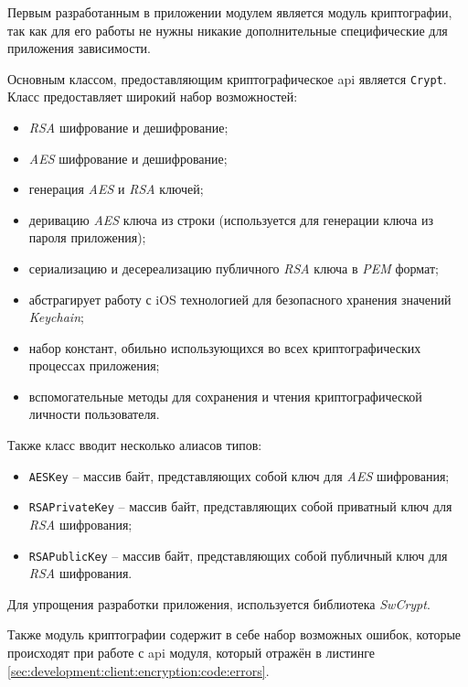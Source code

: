 \subsubsection{}
\label{sec:development:client:encryption}

Первым разработанным в приложении модулем является модуль криптографии, так как для его работы не нужны никакие дополнительные специфические для приложения зависимости.

Основным классом, предоставляющим криптографическое \gls{api} является \texttt{Crypt}. Класс предоставляет широкий набор возможностей:

\begin{itemize}
	\item \textit{RSA} шифрование и дешифрование;
	\item \textit{AES} шифрование и дешифрование;
	\item генерация \textit{AES} и \textit{RSA} ключей;
	\item деривацию \textit{AES} ключа из строки (используется для генерации ключа из пароля приложения);
	\item сериализацию и десереализацию публичного \textit{RSA} ключа в \textit{PEM} формат;
	\item абстрагирует работу с iOS технологией для безопасного хранения значений \textit{Keychain};
	\item набор констант, обильно использующихся во всех криптографических процессах приложения;
	\item вспомогательные методы для сохранения и чтения криптографической личности пользователя.
\end{itemize}

Также класс вводит несколько алиасов типов:
\begin{itemize}
	\item \texttt{AESKey} -- массив байт, представляющих собой ключ для \textit{AES} шифрования;
	\item \texttt{RSAPrivateKey} -- массив байт, представляющих собой приватный ключ для \textit{RSA} шифрования;
	\item \texttt{RSAPublicKey} -- массив байт, представляющих собой публичный ключ для \textit{RSA} шифрования.
\end{itemize}

Для упрощения разработки приложения, используется библиотека \textit{SwCrypt}.

Также модуль криптографии содержит в себе набор возможных ошибок, которые происходят при работе с \gls{api} модуля, который отражён в листинге \ref{sec:development:client:encryption:code:errors}.

